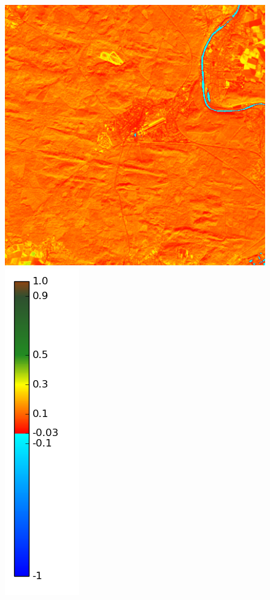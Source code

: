 \documentclass{book}
\begin{document}
\begin{figure}[H]
{\includegraphics[scale=0.2]{images/Fontainebleau/12_ndvi.png}
\includegraphics[scale=0.2]{images/colormap.png}
}
\begin{center}

\end{center}
\end{figure}
\end{document}
